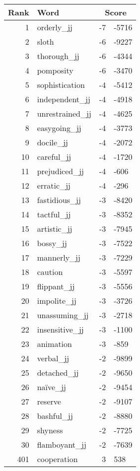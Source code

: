 \begin{longtable}[!htbp]{| rlr@{.}l |}
    \hline
    \textbf{Rank} & \textbf{Word} & \multicolumn{2}{c|}{\textbf{Score}} \\
    \hline
    \endhead
    1 & orderly\_jj & -7 & -5716 \\
    2 & sloth & -6 & -9227 \\
    3 & thorough\_jj & -6 & -4344 \\
    4 & pomposity & -6 & -3470 \\
    5 & sophistication & -4 & -5412 \\
    6 & independent\_jj & -4 & -4918 \\
    7 & unrestrained\_jj & -4 & -4625 \\
    8 & easygoing\_jj & -4 & -3773 \\
    9 & docile\_jj & -4 & -2072 \\
    10 & careful\_jj & -4 & -1720 \\
    11 & prejudiced\_jj & -4 & -606 \\
    12 & erratic\_jj & -4 & -296 \\
    13 & fastidious\_jj & -3 & -8420 \\
    14 & tactful\_jj & -3 & -8352 \\
    15 & artistic\_jj & -3 & -7945 \\
    16 & bossy\_jj & -3 & -7522 \\
    17 & mannerly\_jj & -3 & -7229 \\
    18 & caution & -3 & -5597 \\
    19 & flippant\_jj & -3 & -5556 \\
    20 & impolite\_jj & -3 & -3726 \\
    21 & unassuming\_jj & -3 & -2718 \\
    22 & insensitive\_jj & -3 & -1100 \\
    23 & animation & -3 & -859 \\
    24 & verbal\_jj & -2 & -9899 \\
    25 & detached\_jj & -2 & -9650 \\
    26 & naïve\_jj & -2 & -9454 \\
    27 & reserve & -2 & -9107 \\
    28 & bashful\_jj & -2 & -8880 \\
    29 & shyness & -2 & -7725 \\
    30 & flamboyant\_jj & -2 & -7639 \\
    401 & cooperation & 3 & 538 \\

\end{longtable}
